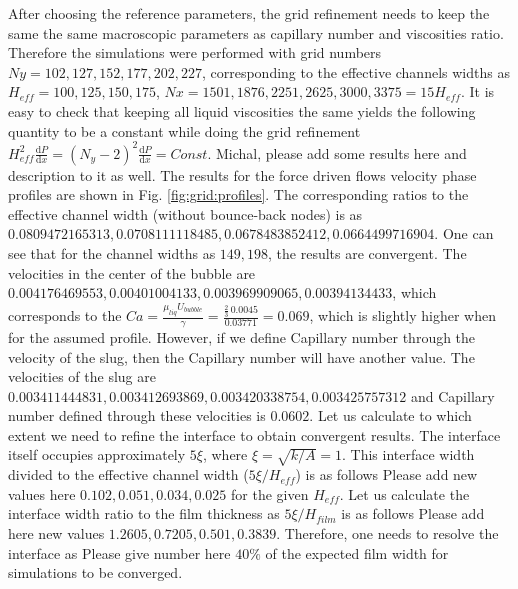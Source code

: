 \documentclass{article}
\begin{document}
After choosing the reference parameters, the grid refinement needs to keep the
same the same macroscopic parameters as capillary number and viscosities ratio.
Therefore the simulations were performed with grid
numbers $Ny=102,127,152,177,202,227$, corresponding to the
effective channels widths as $H_{eff}=100,125,150,175$,
$Nx=1501,1876,2251,2625,3000,3375=15
H_{eff}$. It is easy to check
that keeping all liquid viscosities the same yields the following quantity to
be a
constant while doing the grid refinement
$H_{eff}^2\frac{\mathrm{d}P}{\mathrm{d}x}=(N_y-2)^2\frac{\mathrm{d}P}{\mathrm{d}
x } =Const$.
{\color{red} Michal, please add some results here and description to it as well.
The results for the force driven flows velocity phase profiles are shown in
Fig. \ref{fig:grid:profiles}. The corresponding ratios to the effective channel
width (without bounce-back nodes) is as $0.0809472165313,
0.0708111118485, 0.0678483852412, 0.0664499716904$. One can see
that for the channel widths as $149,198$, the results are convergent. The
velocities in the center of the bubble are $0.004176469553,
0.00401004133, 0.003969909065, 0.00394134433$, which corresponds
to the $Ca=\frac{\mu_{liq} U_{bubble}}{\gamma}=\frac{\frac{2}{3}\,
0.0045}{0.03771}=0.069$, which is slightly higher when for the assumed
profile. However, if we define Capillary number through the velocity of the
slug, then the Capillary number will have another value. The velocities of the
slug are $0.003411444831,0.003412693869,0.003420338754,0.003425757312$ and
Capillary number defined through these velocities is $0.0602$. 
}
Let us calculate to which extent we need to refine the interface to obtain
convergent results. The interface itself occupies approximately $5 \xi$, where
$\xi=\sqrt{k/A}=1$. This interface width divided to the effective channel width
($5\xi/H_{eff}$) is as follows {\color{red} Please add new values here
$0.102,0.051,0.034,0.025$ } for the given
$H_{eff}$. Let us calculate the interface width ratio to the film thickness as
$5\xi/H_{film}$ is as follows
{\color{red} Please add here new values $1.2605,  0.7205,  0.501,  0.3839$}.
Therefore, one needs to
resolve the interface as {\color{red} Please give number here $40\%$} of the
expected film width for simulations to be converged.
\end{document}
